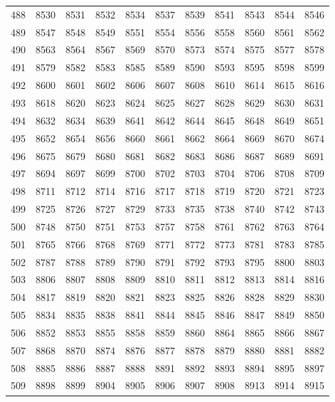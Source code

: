 \begin{longtable}{|r|rrrrrrrrrr|}
  488 & 8530 & 8531 & 8532 & 8534 & 8537 & 8539 & 8541 & 8543 & 8544 & 8546 \\ 
  489 & 8547 & 8548 & 8549 & 8551 & 8554 & 8556 & 8558 & 8560 & 8561 & 8562 \\ 
  490 & 8563 & 8564 & 8567 & 8569 & 8570 & 8573 & 8574 & 8575 & 8577 & 8578 \\ 
  491 & 8579 & 8582 & 8583 & 8585 & 8589 & 8590 & 8593 & 8595 & 8598 & 8599 \\ 
  492 & 8600 & 8601 & 8602 & 8606 & 8607 & 8608 & 8610 & 8614 & 8615 & 8616 \\ 
  493 & 8618 & 8620 & 8623 & 8624 & 8625 & 8627 & 8628 & 8629 & 8630 & 8631 \\ 
  494 & 8632 & 8634 & 8639 & 8641 & 8642 & 8644 & 8645 & 8648 & 8649 & 8651 \\ 
  495 & 8652 & 8654 & 8656 & 8660 & 8661 & 8662 & 8664 & 8669 & 8670 & 8674 \\ 
  496 & 8675 & 8679 & 8680 & 8681 & 8682 & 8683 & 8686 & 8687 & 8689 & 8691 \\ 
  497 & 8694 & 8697 & 8699 & 8700 & 8702 & 8703 & 8704 & 8706 & 8708 & 8709 \\ 
  498 & 8711 & 8712 & 8714 & 8716 & 8717 & 8718 & 8719 & 8720 & 8721 & 8723 \\ 
  499 & 8725 & 8726 & 8727 & 8729 & 8733 & 8735 & 8738 & 8740 & 8742 & 8743 \\ 
  500 & 8748 & 8750 & 8751 & 8753 & 8757 & 8758 & 8761 & 8762 & 8763 & 8764 \\ 
  501 & 8765 & 8766 & 8768 & 8769 & 8771 & 8772 & 8773 & 8781 & 8783 & 8785 \\ 
  502 & 8787 & 8788 & 8789 & 8790 & 8791 & 8792 & 8793 & 8795 & 8800 & 8803 \\ 
  503 & 8806 & 8807 & 8808 & 8809 & 8810 & 8811 & 8812 & 8813 & 8814 & 8816 \\ 
  504 & 8817 & 8819 & 8820 & 8821 & 8823 & 8825 & 8826 & 8828 & 8829 & 8830 \\ 
  505 & 8834 & 8835 & 8838 & 8841 & 8844 & 8845 & 8846 & 8847 & 8849 & 8850 \\ 
  506 & 8852 & 8853 & 8855 & 8858 & 8859 & 8860 & 8864 & 8865 & 8866 & 8867 \\ 
  507 & 8868 & 8870 & 8874 & 8876 & 8877 & 8878 & 8879 & 8880 & 8881 & 8882 \\ 
  508 & 8885 & 8886 & 8887 & 8888 & 8891 & 8892 & 8893 & 8894 & 8895 & 8897 \\ 
  509 & 8898 & 8899 & 8904 & 8905 & 8906 & 8907 & 8908 & 8913 & 8914 & 8915 \\ 

\end{longtable}
